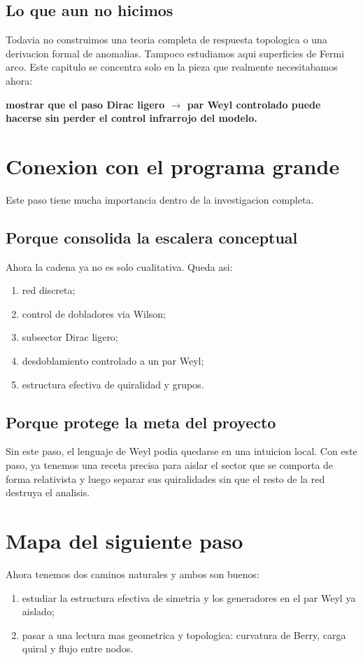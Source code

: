 \subsection*{Lo que aun no hicimos}
Todavia no construimos una teoria completa de respuesta topologica o una derivacion formal de anomalias. Tampoco estudiamos aqui superficies de Fermi arco. Este capitulo se concentra solo en la pieza que realmente necesitabamos ahora:
\begin{displayquote}
\textbf{mostrar que el paso Dirac ligero \(\to\) par Weyl controlado puede hacerse sin perder el control infrarrojo del modelo.}
\end{displayquote}

\section{Conexion con el programa grande}
Este paso tiene mucha importancia dentro de la investigacion completa.

\subsection{Porque consolida la escalera conceptual}
Ahora la cadena ya no es solo cualitativa. Queda asi:
\begin{enumerate}[label=\arabic*.]
    \item red discreta;
    \item control de dobladores via Wilson;
    \item subsector Dirac ligero;
    \item desdoblamiento controlado a un par Weyl;
    \item estructura efectiva de quiralidad y grupos.
\end{enumerate}

\subsection{Porque protege la meta del proyecto}
Sin este paso, el lenguaje de Weyl podia quedarse en una intuicion local. Con este paso, ya tenemos una receta precisa para aislar el sector que se comporta de forma relativista y luego separar sus quiralidades sin que el resto de la red destruya el analisis.

\section{Mapa del siguiente paso}
Ahora tenemos dos caminos naturales y ambos son buenos:
\begin{enumerate}[label=\arabic*.]
    \item estudiar la estructura efectiva de simetria y los generadores en el par Weyl ya aislado;
    \item pasar a una lectura mas geometrica y topologica: curvatura de Berry, carga quiral y flujo entre nodos.
\end{enumerate}

